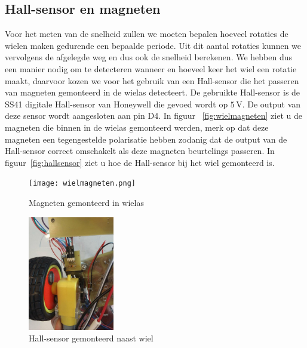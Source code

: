 \subsection{Hall-sensor en magneten}\label{sec:hall-sensor}
Voor het meten van de snelheid zullen we moeten bepalen hoeveel rotaties de wielen maken gedurende een bepaalde periode. Uit dit aantal rotaties kunnen we vervolgens de afgelegde weg en dus ook de snelheid berekenen. We hebben dus een manier nodig om te detecteren wanneer en hoeveel keer het wiel een rotatie maakt, daarvoor kozen we voor het gebruik van een Hall-sensor die het passeren van magneten gemonteerd in de wielas detecteert. De gebruikte Hall-sensor is de SS41 digitale Hall-sensor van Honeywell die gevoed wordt op $5\,\mathrm{V}$. De output van deze sensor wordt aangesloten aan pin D4. In figuur ~\vref{fig:wielmagneten} ziet u de magneten die binnen in de wielas gemonteerd werden, merk op dat deze magneten een tegengestelde polarisatie hebben zodanig dat de output van de Hall-sensor correct omschakelt als deze magneten beurtelings passeren. In figuur~\vref{fig:hallsensor} ziet u hoe de Hall-sensor bij het wiel gemonteerd is.

\begin{figure}[H]
	\centering
	\begin{minipage}[b]{0.4\textwidth}
		\centering
		\texttt{[image: wielmagneten.png]}
		\caption{Magneten gemonteerd in wielas\label{fig:wielmagneten}}
	\end{minipage}
	\hfill
	\begin{minipage}[b]{0.4\textwidth}
		\centering
		\includegraphics[height=5cm]{hallsensor.png}
		\caption{Hall-sensor gemonteerd naast wiel\label{fig:hallsensor}}
	\end{minipage}
\end{figure}


